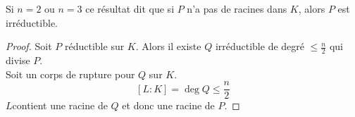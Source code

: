 \begin{remarque}
	Si $n = 2$ ou $n = 3$ ce résultat dit que si $P$ n'a pas de racines dans $K$, alors $P$ est irréductible.
\end{remarque}


\begin{proof}
	Soit $P$ réductible sur $K$. Alors il existe $Q$ irréductible de degré $\leq \frac{n}{2}$ qui divise $P$.\\
	Soit un corps de rupture pour $Q$ sur $K$.\\
	$$ [L : K] = \deg Q \leq \frac{n}{2}$$
	$L$contient une racine de $Q$ et donc une racine de $P$.
\end{proof}





